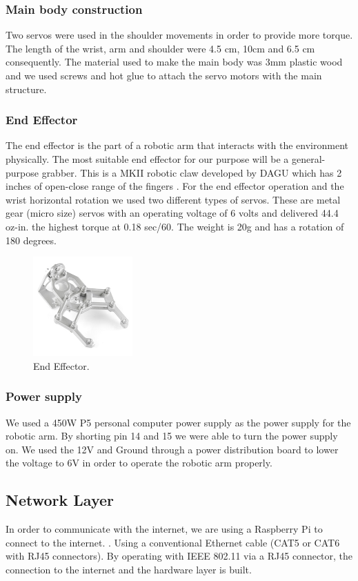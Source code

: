 \documentclass[conference]{IEEEtran}
\begin{document}
\subsubsection{Main body construction}
Two servos were used in the shoulder movements in order to provide more torque. The length of the wrist, arm and shoulder were 4.5 cm, 10cm and 6.5 cm consequently. The material used to make the main body was 3mm plastic wood and we used screws and hot glue to attach the servo motors with the main structure.

\subsubsection{End Effector}
The end effector is the part of a robotic arm that interacts with the environment physically. The most suitable end effector for our purpose will be a general-purpose grabber. This is a MKII robotic claw developed by DAGU which has 2 inches of open-close range of the fingers \cite{eighteen}. For the end effector operation and the wrist horizontal rotation we used two different types of servos. These are metal gear (micro size) servos with an operating voltage of 6 volts and delivered 44.4 oz-in. the highest torque at 0.18 sec/60. The weight is 20g and has a rotation of 180 degrees.
\begin{figure}[ht!] %
 \centering
 \includegraphics[width=1.5in]{Picture4.png}
 \caption{End Effector.}
 \label{endEffector}
 \end{figure}


\subsubsection{Power supply}
We used a 450W P5 personal computer power supply as the power supply for the robotic arm. By shorting pin 14 and 15 we were able to turn the power supply on. We used the 12V and Ground through a power distribution board to lower the voltage to 6V in order to operate the robotic arm properly.

\subsection{Network Layer}
In order to communicate with the internet, we are using a Raspberry Pi to connect to the internet. \cite{seventeen}. Using a conventional Ethernet cable (CAT5 or CAT6 with RJ45 connectors). By operating with IEEE 802.11 via a RJ45 connector, the connection to the internet and the hardware layer is built.
\end{document}
